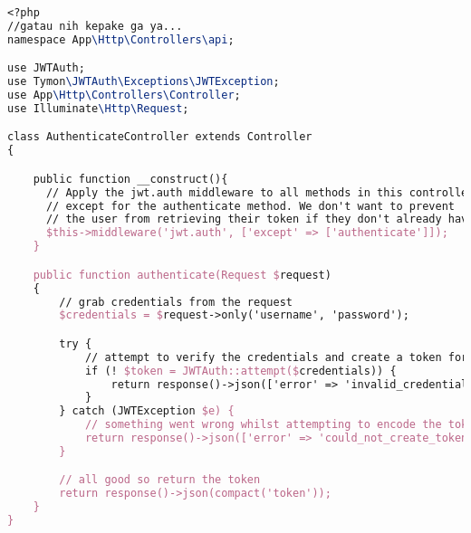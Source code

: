 \begin{lstlisting}[language=tex,basicstyle=\tiny,caption=AuthenticateController.php]
	<?php
//gatau nih kepake ga ya...
namespace App\Http\Controllers\api;

use JWTAuth;
use Tymon\JWTAuth\Exceptions\JWTException;
use App\Http\Controllers\Controller;
use Illuminate\Http\Request;

class AuthenticateController extends Controller
{

    public function __construct(){
      // Apply the jwt.auth middleware to all methods in this controller
      // except for the authenticate method. We don't want to prevent
      // the user from retrieving their token if they don't already have it
      $this->middleware('jwt.auth', ['except' => ['authenticate']]);
    }

    public function authenticate(Request $request)
    {
        // grab credentials from the request
        $credentials = $request->only('username', 'password');

        try {
            // attempt to verify the credentials and create a token for the user
            if (! $token = JWTAuth::attempt($credentials)) {
                return response()->json(['error' => 'invalid_credentials'], 401);
            }
        } catch (JWTException $e) {
            // something went wrong whilst attempting to encode the token
            return response()->json(['error' => 'could_not_create_token'], 500);
        }

        // all good so return the token
        return response()->json(compact('token'));
    }
}

\end{lstlisting}

